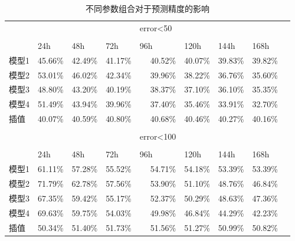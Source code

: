 \begin{table}[htbp]
  \centering
  \caption{不同参数组合对于预测精度的影响}
    \begin{tabular}{rrrrrrrrr}
    \hline
           &       &       &       &\multicolumn{1}{l}{error<50} &       &       &       &  \\\\
           \hline
          & \multicolumn{1}{l}{24h} & \multicolumn{1}{l}{48h} & \multicolumn{1}{l}{72h} & \multicolumn{1}{l}{96h} & \multicolumn{1}{l}{120h} & \multicolumn{1}{l}{144h} & \multicolumn{1}{l}{168h} &  \\
          \hline
    \multicolumn{1}{l}{模型1} & 45.66\% & 42.49\% & 41.17\% & 40.52\%  & 40.07\% & 39.83\% & 39.82\% &  \\
    \multicolumn{1}{l}{模型2} & 53.01\% & 46.02\% & 42.34\% & 39.96\% & 38.22\% & 36.76\% & 35.60\% &  \\
    \multicolumn{1}{l}{模型3} & 48.80\% & 43.20\% & 40.19\% & 38.37\% & 37.10\% & 36.10\% & 35.35\% &  \\
    \multicolumn{1}{l}{模型4} & 51.49\% & 43.94\% & 39.96\% & 37.40\% & 35.46\% & 33.91\% & 32.70\% &  \\
    \multicolumn{1}{l}{插值} & 40.07\% & 40.59\% & 40.80\% & 40.68\% & 40.46\% & 40.27\% & 40.16\% &  \\
    \hline
          &       &       &       &       &       &       &       &  \\
          &       &       &       &\multicolumn{1}{l}{error<100} &       &       &       &  \\ \\
          \hline
          & \multicolumn{1}{l}{24h} & \multicolumn{1}{l}{48h} & \multicolumn{1}{l}{72h} & \multicolumn{1}{l}{96h} & \multicolumn{1}{l}{120h} & \multicolumn{1}{l}{144h} & \multicolumn{1}{l}{168h} &  \\
          \hline
    \multicolumn{1}{l}{模型1} & 61.11\% & 57.28\% & 55.52\% & 54.71\% & 54.18\% & 53.39\% & 53.39\% &  \\
    \multicolumn{1}{l}{模型2} & 71.79\% & 62.78\% & 57.56\% & 53.90\% & 51.10\% & 48.76\% & 46.84\% &  \\
    \multicolumn{1}{l}{模型3} & 67.35\% & 59.42\% & 55.17\% & 52.37\% & 50.29\% & 48.63\% & 47.36\% &  \\
    \multicolumn{1}{l}{模型4} & 69.63\% & 59.75\% & 54.03\% & 49.98\% & 46.84\% & 44.29\% & 42.23\% &  \\
    \multicolumn{1}{l}{插值} & 50.34\% & 51.40\% & 51.73\% & 51.56\% & 51.27\% & 50.99\% & 50.82\% &  \\

\end{tabular}
\end{table}
